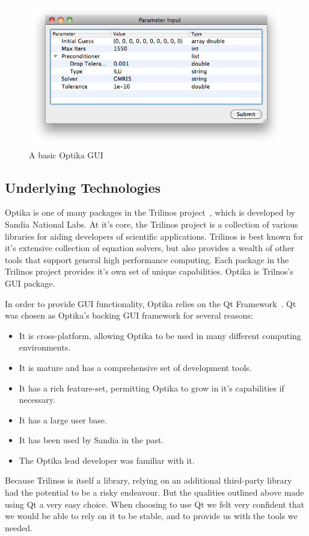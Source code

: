 \begin{figure}
\centering
\includegraphics[scale=0.5]{graphics/basic_example}
\caption[Basic GUI]{A basic Optika GUI}
\label{basicexample}
\end{figure} 

\subsection{Underlying Technologies}
Optika is one of many packages in the Trilinos project~\cite{trilinos}, which is developed by Sandia National Labs. At it's core, 
the Trilinos project is a collection of various
libraries for aiding developers of scientific applications. Trilinos is best known for it's extensive collection of equation solvers,
but also provides a wealth of other tools that support general high performance computing. Each package in the Trilinos project provides
it's own set of unique capabilities. Optika is Trilnos's GUI package.

In order to provide GUI functionality, Optika relies on the Qt Framework~\cite{Qt}. 
Qt was chosen as Optika's backing GUI framework for several
reasons:
	\begin{itemize}
		\item It is cross-platform, allowing Optika to be used in many different computing environments.
		\item It is mature and has a comprehensive set of development tools. 
		\item It has a rich feature-set, permitting Optika to grow in it's capabilities if necessary.
    \item It has a large user base.
		\item It has been used by Sandia in the past.
		\item The Optika lead developer was familiar with it.
	\end{itemize}
Because Trilinos is itself a library, relying on an additional third-party library had the potential to be a risky endeavour. But
the qualities outlined above made using Qt a very easy choice. When choosing to use Qt we felt very confident that we 
would be able to rely on it to be stable, and to provide us with the tools we needed.

